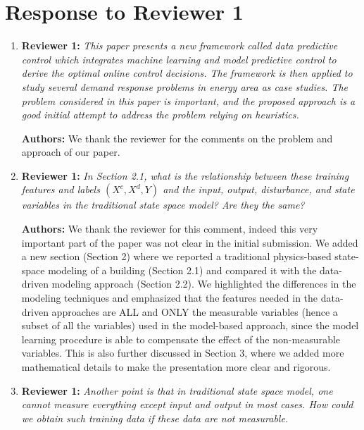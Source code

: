 \documentclass{article}
\begin{document}



\section{Response to Reviewer 1}



\begin{enumerate}

\item \textbf{Reviewer 1:} \textit{This paper presents a new framework called data predictive control which integrates machine learning and model predictive control to derive the optimal online control decisions. The framework is then applied to study several demand response problems in energy area as case studies. The problem considered in this paper is important, and the proposed approach is a good initial attempt to address the problem relying on heuristics.}



\textbf{Authors:} We thank the reviewer for the comments on the problem and approach of our paper.



\item \textbf{Reviewer 1:} \textit{In Section 2.1, what is the relationship between these training features and labels $(X^c, X^d, Y)$ and the input, output, disturbance, and state variables in the traditional state space model? Are they the same?}



\textbf{Authors:} We thank the reviewer for this comment, indeed this very important part of the paper was not clear in the initial submission. We added a new section (Section 2) where we reported a traditional physics-based state-space modeling of a building (Section 2.1) and compared it with the data-driven modeling approach (Section 2.2). We highlighted the differences in the modeling techniques and emphasized that the features needed in the data-driven approaches are ALL and ONLY the measurable variables (hence a subset of all the variables) used in the model-based approach, since the model learning procedure is able to compensate the effect of the non-measurable variables. This is also further discussed in Section 3, where we added more mathematical details to make the presentation more clear and rigorous.



\item \textbf{Reviewer 1:} \textit{Another point is that in traditional state space model, one cannot measure everything except input and output in most cases. How could we obtain such training data if these data are not measurable.}




\end{enumerate}
\end{document}
